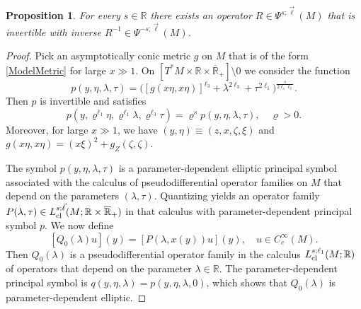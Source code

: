 \documentclass[reqno]{amsart}
\numberwithin{equation}{section}
\newtheorem{proposition}[equation]{Proposition}
\theoremstyle{definition}
\def\R{\mathbb R}
\begin{document}
\begin{proposition}\label{ReductionOrder}
For every $s \in \R$ there exists an operator $R \in \Psi^{s;\vec{\ell}}(M)$ that is invertible with inverse $R^{-1} \in \Psi^{-s;\vec{\ell}}(M)$.
\end{proposition}
\begin{proof}
Pick an asymptotically conic metric $g$ on $M$ that is of the form \eqref{ModelMetric} for large $x \gg 1$. On $[T^*M \times \R \times \overline{\R}_+] \setminus 0$ we consider the function
$$
p(y,\eta,\lambda,\tau) = \bigl([g(x\eta,x\eta)]^{\ell_3} + \lambda^{2\ell_3} + \tau^{2\ell_1}\bigr)^{\frac{s}{2\ell_1\ell_3}}.
$$
Then $p$ is invertible and satisfies
$$
p(y,\varrho^{\ell_1}\eta,\varrho^{\ell_1}\lambda,\varrho^{\ell_3}\tau) = \varrho^sp(y,\eta,\lambda,\tau), \quad \varrho > 0.
$$
Moreover, for large $x \gg 1$, we have $(y,\eta) \equiv (z,x,\zeta,\xi)$ and $g(x\eta,x\eta) = (x\xi)^2 + g_Z(\zeta,\zeta)$.

The symbol $p(y,\eta,\lambda,\tau)$ is a parameter-dependent elliptic principal symbol associated with the calculus of pseudodifferential operator families on $M$ that depend on the parameters $(\lambda,\tau)$. Quantizing yields an operator family $P(\lambda,\tau) \in L^{s;\vec{\ell}}_{\textup{cl}}(M;\R\times\overline{\R}_+)$ in that calculus with parameter-dependent principal symbol $p$. We now define
$$
[Q_0(\lambda)u](y) = [P(\lambda,x(y))u](y), \quad u \in C_c^{\infty}(M).
$$
Then $Q_0(\lambda)$ is a pseudodifferential operator family in the calculus $L^{s;\ell_1}_{\textup{cl}}(M;\R)$ of operators that depend on the parameter $\lambda \in \R$. The parameter-dependent principal symbol is $q(y,\eta,\lambda) = p(y,\eta,\lambda,0)$, which shows that $Q_0(\lambda)$ is parameter-dependent elliptic.


\end{proof}
\end{document}
